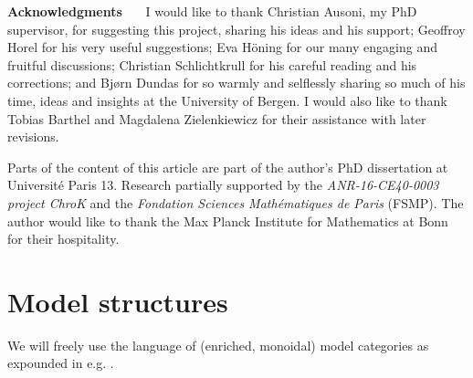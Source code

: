 \documentclass[a4paper,11pt]{amsart} %
\theoremstyle{definition} \newtheorem{defn}[equation]{Definition}
\theoremstyle{remark} \newtheorem{notation}[equation]{Notation}
\theoremstyle{plain} \newtheorem{teo}[equation]{Theorem}
\theoremstyle{plain} \newtheorem{lema}[equation]{Lemma}
\theoremstyle{plain} \newtheorem{prop}[equation]{Proposition}
\theoremstyle{plain} \newtheorem{corolario}[equation]{Corollary}
\theoremstyle{remark} \newtheorem{obs}[equation]{Remark}
\theoremstyle{remark} \newtheorem{sideobs}[equation]{Side remark}
\theoremstyle{remark} \newtheorem{ejercicio}[equation]{Exercise}
\theoremstyle{definition} \newtheorem{notn}[equation]{Notation}
\theoremstyle{remark} \newtheorem{ej}[equation]{Example}
\theoremstyle{remark} \newtheorem{contraej}[equation]{Counterexample}
\theoremstyle{plain} \newtheorem{conj}[equation]{Conjecture}
\newcommand{\paragrafo}[1]{\textbf{#1}\ \ \ }
\renewcommand{\1}{\ensuremath{\mathbbm{1}}}
\numberwithin{equation}{section}
\begin{document}
\paragrafo{Acknowledgments} I would like to thank Christian Ausoni, my PhD supervisor, for suggesting this project, sharing his ideas and his support; Geoffroy Horel for his very useful suggestions; Eva Höning for our many engaging and fruitful discussions; Christian Schlichtkrull for his careful reading and his corrections; and Bj\o rn Dundas for so warmly and selflessly sharing so much of his time, ideas and insights at the University of Bergen. I would also like to thank Tobias Barthel and Magdalena Zielenkiewicz for their assistance with later revisions.

Parts of the content of this article are part of the author's PhD dissertation at Université Paris 13. Research partially supported by the \emph{ANR-16-CE40-0003 project ChroK} and the \emph{Fondation Sciences Mathématiques de Paris} (FSMP). The author would like to thank the Max Planck Institute for Mathematics at Bonn for their hospitality. 

%


%
\section{Model structures} \label{sect-cof}

We will freely use the language of (enriched, monoidal) model categories as expounded in e.g. \cite{mayponto}.
\end{document}
